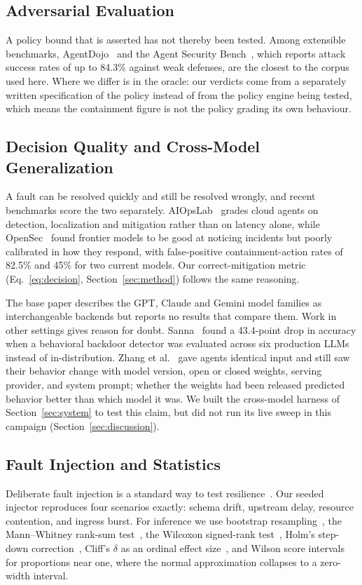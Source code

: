 \subsection{Adversarial Evaluation}
A policy bound that is asserted has not thereby been tested. Among extensible benchmarks,
AgentDojo~\cite{debenedetti2024agentdojo} and the Agent Security Bench~\cite{zhang2024asb}, which
reports attack success rates of up to 84.3\% against weak defenses, are the closest to the corpus used
here. Where we differ is in the oracle: our verdicts come from a separately written specification of
the policy instead of from the policy engine being tested, which means the containment figure is not
the policy grading its own behaviour.

\subsection{Decision Quality and Cross-Model Generalization}
A fault can be resolved quickly and still be resolved wrongly, and recent benchmarks score the two
separately. AIOpsLab~\cite{chen2025aiopslab} grades cloud agents on detection, localization and
mitigation rather than on latency alone, while OpenSec~\cite{barnes2026opensec} found frontier models
to be good at noticing incidents but poorly calibrated in how they respond, with false-positive
containment-action rates of 82.5\% and 45\% for two current models. Our correct-mitigation metric
(Eq.~\eqref{eq:decision}, Section~\ref{sec:method}) follows the same reasoning.

The base paper describes the GPT, Claude and Gemini model families as interchangeable backends but
reports no results that compare them. Work in other settings gives reason for doubt.
Sanna~\cite{sanna2025crossllm} found a 43.4-point drop in accuracy when a behavioral backdoor detector
was evaluated across six production LLMs instead of in-distribution. Zhang
et al.~\cite{zhang2026towardagentic} gave agents identical input and still saw their behavior change
with model version, open or closed weights, serving provider, and system prompt; whether the weights
had been released predicted behavior better than which model it was. We built the cross-model harness
of Section~\ref{sec:system} to test this claim, but did not run its live sweep in this campaign
(Section~\ref{sec:discussion}).

\subsection{Fault Injection and Statistics}
Deliberate fault injection is a standard way to test resilience~\cite{basiri2016chaos}. Our
seeded injector reproduces four scenarios exactly: schema drift, upstream delay, resource contention,
and ingress burst. For inference we use bootstrap resampling~\cite{efron1979}, the Mann--Whitney
rank-sum test~\cite{mann1947}, the Wilcoxon signed-rank test~\cite{wilcoxon1945}, Holm's step-down
correction~\cite{holm1979}, Cliff's $\delta$ as an ordinal effect size~\cite{cliff1993}, and Wilson
score intervals~\cite{wilson1927} for proportions near one, where the normal approximation collapses
to a zero-width interval.

